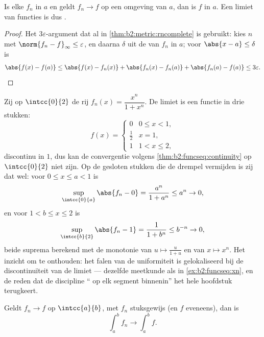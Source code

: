 \begin{theorem}[Continuïteit]\label{thm:b2:funcseq:continuity}
Is elke $f_n$  in $a$ en geldt $f_n \to f$  op een
omgeving van $a$, dan is $f$  in $a$. Een  limiet
van  functies is dus .
\end{theorem}

\begin{proof}
Het $3\varepsilon$-argument dat al in
\cref{thm:b2:metric:rncomplete} is gebruikt: kies $n$ met
$\norm{f_n - f}_\infty \leq \varepsilon$, en daarna $\delta$ uit de
 van $f_n$ in $a$; voor $\abs{x - a} \leq \delta$ is
\[
\abs{f(x) - f(a)} \leq \abs{f(x) - f_n(x)} + \abs{f_n(x) - f_n(a)}
+ \abs{f_n(a) - f(a)} \leq 3\varepsilon . \qedhere
\]
\end{proof}

\begin{example}\label{ex:b2:funcseq:threshold}
Zij op $\intcc{0}{2}$ de rij $f_n(x) = \dfrac{x^n}{1 + x^n}$. De
 limiet is een functie in drie stukken:
\[
f(x) = \begin{cases} 0 & 0 \leq x < 1,\\[2pt]
\tfrac12 & x = 1,\\[2pt]
1 & 1 < x \leq 2, \end{cases}
\]
discontinu in $1$, dus kan de convergentie volgens
\cref{thm:b2:funcseq:continuity} op $\intcc{0}{2}$ niet 
zijn. Op de gesloten stukken die de drempel vermijden is zij dat
wel: voor $0 \leq x \leq a < 1$ is
\[
\sup_{\intcc{0}{a}}\abs{f_n - 0}
= \frac{a^n}{1 + a^n} \leq a^n \to 0 ,
\]
en voor $1 < b \leq x \leq 2$ is
\[
\sup_{\intcc{b}{2}}\abs{f_n - 1}
= \frac{1}{1 + b^n} \leq b^{-n} \to 0 ,
\]
beide suprema berekend met de monotonie van $u \mapsto
\frac{u}{1+u}$ en van $x \mapsto x^n$. Het inzicht om te onthouden:
het falen van de uniformiteit is gelokaliseerd bij de
discontinuïteit van de limiet --- dezelfde meetkunde als in
\cref{ex:b2:funcseq:xn}, en de reden dat de discipline `` op
elk segment binnenin'' het hele hoofdstuk terugkeert.
\end{example}

\begin{theorem}\label{thm:b2:funcseq:integration}
Geldt $f_n \to f$  op $\intcc{a}{b}$, met $f_n$ stuksgewijs
 (en $f$ eveneens), dan is
\[
\int_a^b f_n \longrightarrow \int_a^b f .
\]
\end{theorem}

